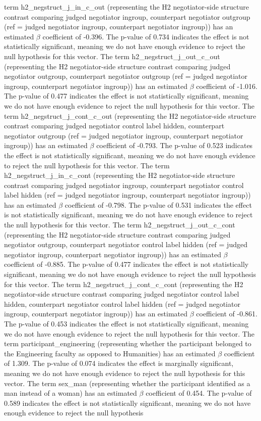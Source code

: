 \documentclass[11pt]{article}
\begin{document}
term h2\_negstruct\_j\_in\_c\_out (representing the H2 negotiator-side structure contrast comparing judged negotiator ingroup, counterpart negotiator outgroup (ref = judged negotiator ingroup, counterpart negotiator ingroup)) has an estimated $\beta$ coefficient of -0.396. The p-value of 0.734 indicates the effect is not statistically significant, meaning we do not have enough evidence to reject the null hypothesis for this vector. The term h2\_negstruct\_j\_out\_c\_out (representing the H2 negotiator-side structure contrast comparing judged negotiator outgroup, counterpart negotiator outgroup (ref = judged negotiator ingroup, counterpart negotiator ingroup)) has an estimated $\beta$ coefficient of -1.016. The p-value of 0.477 indicates the effect is not statistically significant, meaning we do not have enough evidence to reject the null hypothesis for this vector. The term h2\_negstruct\_j\_cont\_c\_out (representing the H2 negotiator-side structure contrast comparing judged negotiator control label hidden, counterpart negotiator outgroup (ref = judged negotiator ingroup, counterpart negotiator ingroup)) has an estimated $\beta$ coefficient of -0.793. The p-value of 0.523 indicates the effect is not statistically significant, meaning we do not have enough evidence to reject the null hypothesis for this vector. The term h2\_negstruct\_j\_in\_c\_cont (representing the H2 negotiator-side structure contrast comparing judged negotiator ingroup, counterpart negotiator control label hidden (ref = judged negotiator ingroup, counterpart negotiator ingroup)) has an estimated $\beta$ coefficient of -0.798. The p-value of 0.531 indicates the effect is not statistically significant, meaning we do not have enough evidence to reject the null hypothesis for this vector. The term h2\_negstruct\_j\_out\_c\_cont (representing the H2 negotiator-side structure contrast comparing judged negotiator outgroup, counterpart negotiator control label hidden (ref = judged negotiator ingroup, counterpart negotiator ingroup)) has an estimated $\beta$ coefficient of -0.885. The p-value of 0.477 indicates the effect is not statistically significant, meaning we do not have enough evidence to reject the null hypothesis for this vector. The term h2\_negstruct\_j\_cont\_c\_cont (representing the H2 negotiator-side structure contrast comparing judged negotiator control label hidden, counterpart negotiator control label hidden (ref = judged negotiator ingroup, counterpart negotiator ingroup)) has an estimated $\beta$ coefficient of -0.861. The p-value of 0.453 indicates the effect is not statistically significant, meaning we do not have enough evidence to reject the null hypothesis for this vector. The term participant\_engineering (representing whether the participant belonged to the Engineering faculty as opposed to Humanities) has an estimated $\beta$ coefficient of 1.309. The p-value of 0.074 indicates the effect is marginally significant, meaning we do not have enough evidence to reject the null hypothesis for this vector. The term sex\_man (representing whether the participant identified as a man instead of a woman) has an estimated $\beta$ coefficient of 0.454. The p-value of 0.589 indicates the effect is not statistically significant, meaning we do not have enough evidence to reject the null hypothesis 
\end{document}
